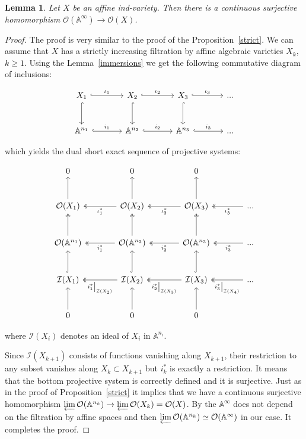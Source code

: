 \documentclass[a4paper,draft,reqno,12pt]{amsart}
\newtheorem{lemma}{Lemma}
\theoremstyle{definition}
\theoremstyle{remark}
\def\BA{{\mathbb A}}
\def\CO{\mathcal{O}}
\def\CI{\mathcal{I}}
\begin{document}
\begin{lemma}\label{spaceSur}
    Let $X$ be an affine ind-variety. Then there is a continuous surjective homomorphism $\CO(\BA^{\infty}) \to \CO(X)$.
\end{lemma}
\begin{proof}
    The proof is very similar to the proof of the Proposition~\ref{strict}. We can assume that $X$ has a strictly increasing filtration by affine algebraic varieties $X_k$, $k \geq 1$. Using the Lemma~\ref{immersions} we get the following commutative diagram of inclusions:

    \[ \begin{tikzcd}[sep=large]
    X_1 \arrow[hook]{r}{\iota_1} \arrow[hook]{d} & X_2 \arrow[hook]{r}{\iota_2} \arrow[hook]{d} & X_3 \arrow[hook]{r}{\iota_3} \arrow[hook]{d} & ...\\%
    \BA^{n_1} \arrow[hook]{r}{i_1} & \BA^{n_2} \arrow[hook]{r}{i_2} & \BA^{n_3} \arrow[hook]{r}{i_3} & ...
    \end{tikzcd}
    \]

    which yields the dual short exact sequence of projective systems:

    \[ \begin{tikzcd}[sep=large]
    0 & 0 & 0\\%
    \mathcal{O}(X_1) \arrow{u} & \mathcal{O}(X_2) \arrow[two heads]{l}{\iota_{1}^{*}} \arrow{u} & \mathcal{O}(X_3) \arrow[two heads]{l}{\iota_{2}^{*}} \arrow{u} & \arrow[two heads]{l}{\iota_{3}^{*}} ...\\%
    \mathcal{O}(\BA^{n_1}) \arrow[two heads]{u} & \mathcal{O}(\BA^{n_2}) \arrow[two heads]{u} \arrow[two heads]{l}{i_1^{*}} & \mathcal{O}(\BA^{n_3}) \arrow[two heads]{u} \arrow[two heads]{l}{i_2^{*}} & \arrow[two heads]{l}{i_3^{*}} ...\\%
    \CI(X_1) \arrow[hook]{u} & \CI(X_2) \arrow[hook]{u} \arrow[two heads]{l}{i_1^{*}{\big|}_{\CI(X_2)}} & \CI(X_3) \arrow[two heads]{l}{i_2^{*}{\big|}_{\CI(X_3)}} \arrow[hook]{u} & \arrow[two heads]{l}{i_3^{*}{\big|}_{\CI(X_4)}} ...\\%
    0 \arrow{u} & 0 \arrow{u} & 0 \arrow{u}
    \end{tikzcd}
    \]
    \vspace{2mm}

    where $\CI(X_i)$ denotes an ideal of $X_i$ in $\BA^{n_i}$.
    
    Since $\CI(X_{k+1})$ consists of functions vanishing along $X_{k+1}$, their restriction to any subset vanishes along $X_{k} \subset X_{k+1}$ but $i_k^{*}$ is exactly a restriction. It means that the bottom projective system is correctly defined and it is surjective. Just as in the proof of Proposition~\ref{strict} it implies that we have a continuous surjective homomorphism $\varprojlim \CO(\BA^{n_k}) \to \varprojlim\CO(X_k) = \CO(X)$. By the \cite[Proposition 1.4.8]{FK} $\BA^{\infty}$ does not depend on the filtration by affine spaces and then $\varprojlim \CO(\BA^{n_k}) \simeq \CO(\BA^{\infty})$ in our case. It completes the proof.
    
\end{proof}
\end{document}
